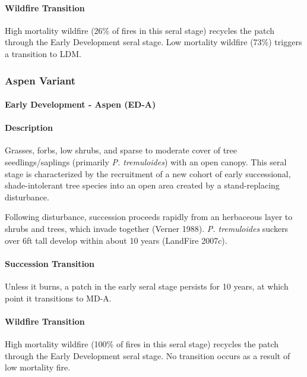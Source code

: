 \paragraph{Wildfire Transition} High mortality wildfire (26\% of fires in this seral stage) recycles the patch through the Early Development seral stage. Low mortality wildfire (73\%) triggers a transition to LDM.

\noindent\hrulefill
\noindent\hrulefill

\subsubsection{Aspen Variant}

\paragraph{Early Development - Aspen (ED-A)}

\paragraph{Description} Grasses, forbs, low shrubs, and sparse to moderate cover of tree seedlings/saplings (primarily \emph{P. tremuloides}) with an open canopy. This seral stage is characterized by the recruitment of a new cohort of early successional, shade-intolerant tree species into an open area created by a stand-replacing disturbance. 

Following disturbance, succession proceeds rapidly from an herbaceous layer to shrubs and trees, which invade together (Verner 1988). \emph{P. tremuloides} suckers over 6ft tall develop within about 10 years (LandFire 2007c). 


\paragraph{Succession Transition} Unless it burns, a patch in the early seral stage persists for 10 years, at which point it transitions to MD-A.

\paragraph{Wildfire Transition} High mortality wildfire (100\% of fires in this seral stage) recycles the patch through the Early Development seral stage. No transition occurs as a result of low mortality fire.

\noindent\hrulefill



